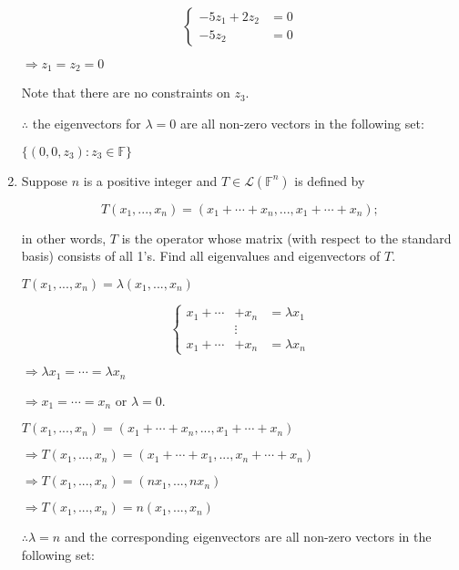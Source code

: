 \documentclass[fleqn]{article}
\makeatletter
\newenvironment{equationCenter}{\@fleqnfalse\begin{equation*}}{\end{equation*}}
\makeatother
\begin{document}
\begin{enumerate}[nolistsep]
		\begin{equation*}
			\left\{
			\begin{aligned}
				-5z_1 + 2z_2 &= 0 \\
				-5z_2 &= 0
			\end{aligned} \right.
		\end{equation*}
		
		$\Rightarrow z_1 = z_2 = 0$
		
		Note that there are no constraints on $z_3$.
		
		$\therefore$ the eigenvectors for $\lambda = 0$ are all non-zero vectors in the following set:
		
		$\{(0, 0, z_3) : z_3 \in \mathbb{F}\}$
		
		\item Suppose $n$ is a positive integer and $T \in \mathcal{L}(\mathbb{F}^n)$ is defined by
		
			\begin{equationCenter}
				T(x_1,...,x_n) = (x_1 + \cdots + x_n,..., x_1 + \cdots + x_n);
			\end{equationCenter}
			
			in other words, $T$ is the operator whose matrix (with respect to the standard basis) consists of all 1's. Find all eigenvalues and eigenvectors of $T$.
			
			$T(x_1,...,x_n) = \lambda(x_1,...,x_n)$
			
			\begin{equation*}
			\left\{
			\begin{aligned}
				x_1 + \cdots &+ x_n &= {\lambda}x_1 \\
			    &\vdots \\
				x_1 + \cdots &+ x_n &= {\lambda}x_n
			\end{aligned} \right.
		\end{equation*}
		
			$\Rightarrow {\lambda}x_1 = \cdots = {\lambda}x_n$
			
			$\Rightarrow x_1 = \cdots = x_n$ or $\lambda = 0$.
			
			$T(x_1,...,x_n) = (x_1 + \cdots + x_n, ..., x_1 + \cdots + x_n)$
			
			$\Rightarrow T(x_1,...,x_n) = (x_1 + \cdots + x_1, ..., x_n + \cdots + x_n)$
			
			$\Rightarrow T(x_1,...,x_n) = (nx_1, ..., nx_n)$
			
			$\Rightarrow T(x_1,...,x_n) = n(x_1, ..., x_n)$
			
			$\therefore \lambda = n$ and the corresponding eigenvectors are all non-zero vectors in the following set:
			

\end{enumerate}
\end{document}
